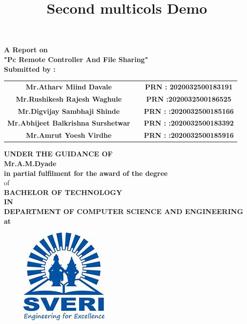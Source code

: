 \documentclass[12pt]{article}
\title{Second multicols Demo}
\begin{document}
 \begin{center}
 \large \textbf {A Report on}\\[2mm]
 \LARGE \textbf {"Pc Remote Controller And File Sharing"}\\[7mm]
 
 \textbf{Submitted by :}\\[2mm]
 \end{center}
 
 
 \begin{tabular}{ c c c } 
 \textbf{Mr.Atharv Miind Davale} & \hspace{1in} & \textbf{ PRN :  2020032500183191} \\ [1mm] 
 \textbf {Mr.Rushikesh Rajesh Waghule} & \hspace{1in} & \textbf{PRN :2020032500186525}\\[1mm]
 \textbf{ Mr.Digvijay Sambhaji Shinde } & \hspace{1in}  & \textbf{PRN : :2020032500185166}\\[1mm]
\textbf{ Mr.Abhijeet Balkrishna Surshetwar} & \hspace{1in}  & \textbf{PRN : :2020032500183392}\\[1mm]
\textbf{ Mr.Amrut Yoesh Virdhe} & \hspace{1in}  & \textbf{PRN : :2020032500185916}\\[7mm] 
\end{tabular} 
 
 
 
 \begin{center}
 \large \textbf {UNDER THE GUIDANCE OF }\\[2mm]
 \large \textbf {Mr.A.M.Dyade}\\[7mm]
 \textbf {in partial fulfilment for the award of the degree} \\[2mm] of \\[2mm]
 
 \large \textbf {BACHELOR OF TECHNOLOGY}\\[2mm]
 \textbf {IN}\\[2mm]
 \textbf {DEPARTMENT OF COMPUTER SCIENCE AND ENGINEERING}\\
 \textbf {at}
 \end{center}
 
 \begin{figure}[h]
 \centering
 \includegraphics[scale=1]{sveri2logo}
\end{figure} 
\end{document}
